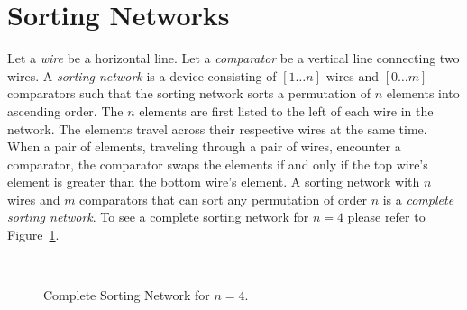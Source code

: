 
\section{Sorting Networks}
Let a \emph{wire} be a horizontal line. Let a \emph{comparator} be a vertical line connecting two wires. A 
\emph{sorting network} is a device consisting of $[1 \dots n]$ wires and $[0 \dots m]$  
comparators such that the sorting network sorts a permutation of $n$ elements into ascending order. The 
$n$ elements are first listed to the left of each wire in the network. The elements travel across their respective wires 
at the same time. When a pair of elements, traveling through a pair of wires, 
encounter a comparator, the comparator swaps the elements if and only if the top wire's element 
is greater than the bottom wire's element. A sorting network with $n$ wires and $m$ 
comparators that can sort any permutation of order $n$ is a \emph{complete sorting network}. 
To see a complete sorting network for $n=4$ please refer to Figure~\ref{Fig:SortNetwork}.\par 

\begin{figure}[h]
   ~\centering
    \caption{Complete Sorting Network for $n=4$.}
    \label{Fig:SortNetwork}
\end{figure}

